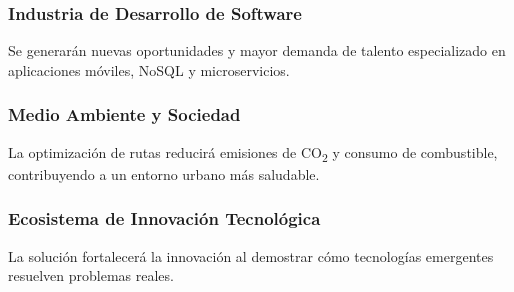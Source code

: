 \subsubsection{Industria de Desarrollo de Software}

Se generarán nuevas oportunidades y mayor demanda de talento especializado en aplicaciones móviles, NoSQL y microservicios.

\subsubsection{Medio Ambiente y Sociedad}

La optimización de rutas reducirá emisiones de CO\textsubscript{2} y consumo de combustible, contribuyendo a un entorno urbano más saludable.

\subsubsection{Ecosistema de Innovación Tecnológica}

La solución fortalecerá la innovación al demostrar cómo tecnologías emergentes resuelven problemas reales.